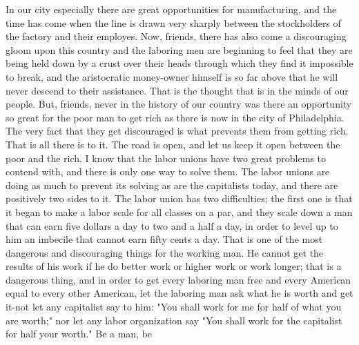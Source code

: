 \documentclass[10pt]{article}
\begin{document}
In our city especially there are great opportunities for manufacturing, and the time has come when the line is drawn very sharply between the stockholders of the factory and their employes. Now, friends, there has also come a discouraging gloom upon this country and the laboring men are beginning to feel that they are being held down by a crust over their heads through which they find it impossible to break, and the aristocratic money-owner himself is so far above that he will never descend to their assistance. That is the thought that is in the minds of our people. But, friends, never in the history of our country was there an opportunity so great for the poor man to get rich as there is now in the city of Philadelphia. The very fact that they get discouraged is what prevents them from getting rich. That is all there is to it. The road is open, and let us keep it open between the poor and the rich. I know that the labor unions have two great problems to contend with, and there is only one way to solve them. The labor unions are doing as much to prevent its solving as are the capitalists today, and there are positively two sides to it. The labor union has two difficulties; the first one is that it began to make a labor scale for all classes on a par, and they scale down a man that can earn five dollars a day to two and a half a day, in order to level up to him an imbecile that cannot earn fifty cents a day. That is one of the most dangerous and discouraging things for the working man. He cannot get the results of his work if he do better work or higher work or work longer; that is a dangerous thing, and in order to get every laboring man free and every American equal to every other American, let the laboring man ask what he is worth and get it-not let any capitalist say to him: "You shall work for me for half of what you are worth;" nor let any labor organization say "You shall work for the capitalist for half your worth." Be a man, be\\
\end{document}
